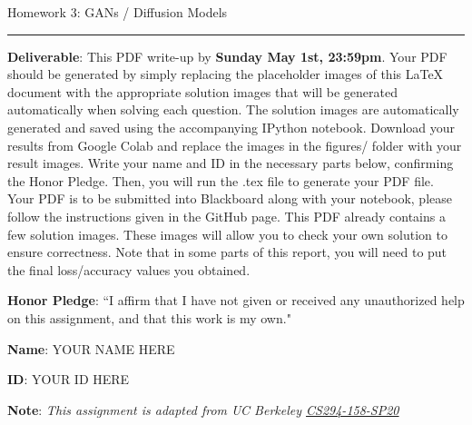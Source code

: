 \documentclass{article}
\newcommand{\ruleskip}{\bigskip\hrule\bigskip}
\begin{document}
\pagestyle{myheadings} 

{\huge
\noindent Homework 3: GANs / Diffusion Models}
\ruleskip

{\bf Deliverable}: This PDF write-up by {\bf Sunday May 1st, 23:59pm}.  Your PDF should be generated by simply replacing the placeholder images of this LaTeX document with the appropriate solution images that will be generated automatically when solving each question. The solution images are automatically generated and saved using the accompanying IPython notebook.  Download your results from Google Colab and replace the images in the figures/ folder with your result images. Write your name and ID in the necessary parts below, confirming the Honor Pledge. Then, you will run the .tex file to generate your PDF file. Your PDF is to be submitted into Blackboard along with your notebook, please follow the instructions given in the GitHub page. This PDF already contains a few solution images.  These images will allow you to check your own solution to ensure correctness. Note that in some parts of this report, you will need to put the final loss/accuracy values you obtained.

{\bf Honor Pledge}: ``I affirm that I have not given or received any unauthorized help on this assignment, and that this work is my own."

{\bf Name}: YOUR NAME HERE

{\bf ID}: YOUR ID HERE

\vspace{.1in}

{\bf Note}: \textit{This assignment is adapted from UC Berkeley \href{https://sites.google.com/view/berkeley-cs294-158-sp20/home}{CS294-158-SP20}}
\vspace{.2in}

\end{document}
